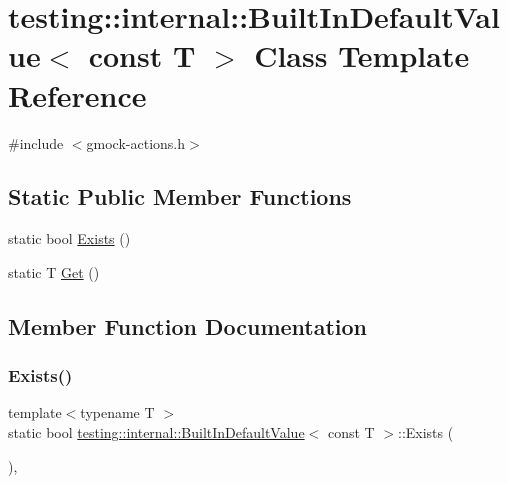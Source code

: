 \hypertarget{classtesting_1_1internal_1_1BuiltInDefaultValue_3_01const_01T_01_4}{}\section{testing\+::internal\+::Built\+In\+Default\+Value$<$ const T $>$ Class Template Reference}
\label{classtesting_1_1internal_1_1BuiltInDefaultValue_3_01const_01T_01_4}


{\ttfamily \#include $<$gmock-\/actions.\+h$>$}

\subsection*{Static Public Member Functions}
\begin{DoxyCompactItemize}
\item 
static bool \mbox{\hyperlink{classtesting_1_1internal_1_1BuiltInDefaultValue_3_01const_01T_01_4_a1814803ec5dcc660ee1f1092a96b79fa}{Exists}} ()
\item 
static T \mbox{\hyperlink{classtesting_1_1internal_1_1BuiltInDefaultValue_3_01const_01T_01_4_a5996754952ecbcc5da77a2cebd4722de}{Get}} ()
\end{DoxyCompactItemize}


\subsection{Member Function Documentation}
\mbox{\label{classtesting_1_1internal_1_1BuiltInDefaultValue_3_01const_01T_01_4_a1814803ec5dcc660ee1f1092a96b79fa}} 
\subsubsection{\texorpdfstring{Exists()}{Exists()}}
{\footnotesize\ttfamily template$<$typename T $>$ \\
static bool \mbox{\hyperlink{classtesting_1_1internal_1_1BuiltInDefaultValue}{testing\+::internal\+::\+Built\+In\+Default\+Value}}$<$ const T $>$\+::Exists (\begin{DoxyParamCaption}{ }\end{DoxyParamCaption})\hspace{0.3cm}{\ttfamily [inline]}, {\ttfamily [static]}}

